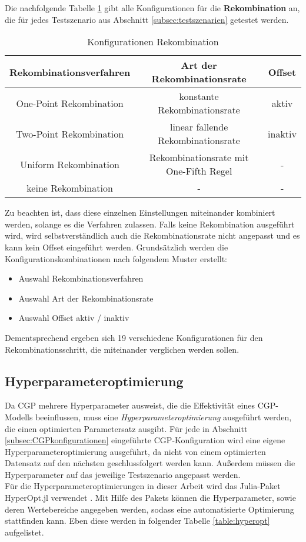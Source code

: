 Die nachfolgende Tabelle \ref{table:Rekombinationskonfigurationen} gibt alle Konfigurationen für die \textbf{Rekombination} an, die für jedes Testszenario aus Abschnitt \ref{subsec:testszenarien} getestet werden.

\begin{table}[H]
	\centering
	\begin{tabular}{c | c | c}
		\textbf{Rekombinationsverfahren} & \textbf{Art der Rekombinationsrate} & \textbf{Offset}\\
		\hline
		One-Point Rekombination & konstante Rekombinationsrate  & aktiv \\
		\hline
		Two-Point Rekombination & linear fallende Rekombinationsrate & inaktiv \\
		\hline
		Uniform Rekombination & Rekombinationsrate mit One-Fifth Regel & - \\
		\hline
		keine Rekombination &  - &  - \\
	\end{tabular}
	\caption{Konfigurationen Rekombination}
	\label{table:Rekombinationskonfigurationen}
\end{table}

Zu beachten ist, dass diese einzelnen Einstellungen miteinander kombiniert werden, solange es die Verfahren zulassen.
Falls keine Rekombination ausgeführt wird, wird selbstverständlich auch die Rekombinationsrate nicht angepasst und es kann kein Offset eingeführt werden.
Grundsätzlich werden die Konfigurationskombinationen nach folgendem Muster erstellt:
\begin{itemize}
	\item Auswahl Rekombinationsverfahren
	\item Auswahl Art der Rekombinationsrate
	\item Auswahl Offset aktiv / inaktiv
\end{itemize}

Dementsprechend ergeben sich 19 verschiedene Konfigurationen für den Rekombinationsschritt, die miteinander verglichen werden sollen. 


\subsection{Hyperparameteroptimierung}
\label{subsec:hpo}

Da CGP mehrere Hyperparameter ausweist, die die Effektivität eines CGP-Modells beeinflussen, muss eine \emph{Hyperparameteroptimierung} ausgeführt werden, die einen optimierten Parametersatz ausgibt.
Für jede in Abschnitt \ref{subsec:CGPkonfigurationen} eingeführte CGP-Konfiguration wird eine eigene Hyperparameteroptimierung ausgeführt, da nicht von einem optimierten Datensatz auf den nächsten geschlussfolgert werden kann.
Außerdem müssen die Hyperparameter auf das jeweilige Testszenario angepasst werden.\\
Für die Hyperparameteroptimierungen in dieser Arbeit wird das Julia-Paket HyperOpt.jl verwendet \cite{carlson_baggepinnenhyperoptjl_2025}.
Mit Hilfe des Pakets können die Hyperparameter, sowie deren Wertebereiche angegeben werden, sodass eine automatisierte Optimierung stattfinden kann.
Eben diese werden in folgender Tabelle \ref{table:hyperopt} aufgelistet.

